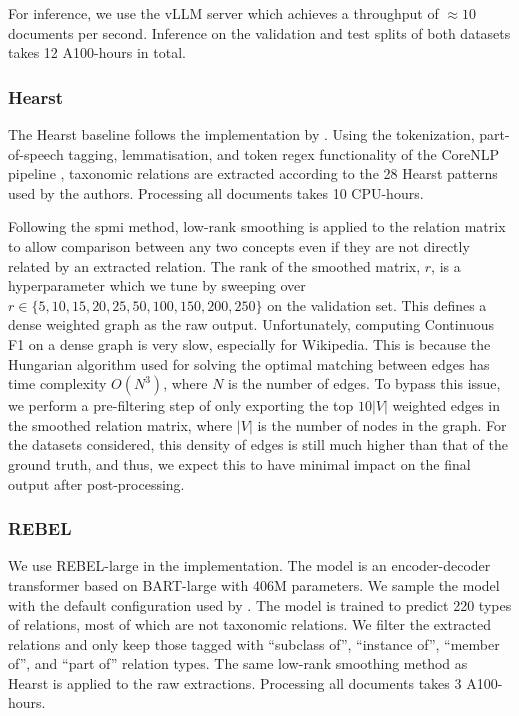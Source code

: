 For inference, we use the vLLM \cite{kwon2023efficient} server which achieves a throughput of $\approx 10$ documents per second. Inference on the validation and test splits of both datasets takes 12 A100-hours in total.

\subsubsection{Hearst}

The Hearst baseline follows the implementation by \citet{roller2018hearst}. Using the tokenization, part-of-speech tagging, lemmatisation, and token regex functionality of the CoreNLP pipeline \cite{manning2014stanford}, taxonomic relations are extracted according to the 28 Hearst patterns used by the authors. Processing all documents takes 10 CPU-hours.

Following the spmi method, low-rank smoothing is applied to the relation matrix to allow comparison between any two concepts even if they are not directly related by an extracted relation. The rank of the smoothed matrix, $r$, is a hyperparameter which we tune by sweeping over $r \in \{5, 10, 15, 20, 25, 50, 100, 150, 200, 250\}$ on the validation set. This defines a dense weighted graph as the raw output. Unfortunately, computing Continuous F1 on a dense graph is very slow, especially for Wikipedia. This is because the Hungarian algorithm used for solving the optimal matching between edges has time complexity $O(N^3)$, where $N$ is the number of edges. To bypass this issue, we perform a pre-filtering step of only exporting the top $10|V|$ weighted edges in the smoothed relation matrix, where $|V|$ is the number of nodes in the graph. For the datasets considered, this density of edges is still much higher than that of the ground truth, and thus, we expect this to have minimal impact on the final output after post-processing.

\subsubsection{REBEL}

We use REBEL-large \cite{cabot2021rebel} in the implementation. The model is an encoder-decoder transformer based on BART-large \cite{lewis2019bart} with 406M parameters. We sample the model with the default configuration used by \citet{cabot2021rebel}. The model is trained to predict 220 types of relations, most of which are not taxonomic relations. We filter the extracted relations and only keep those tagged with ``subclass of'', ``instance of'', ``member of'', and ``part of'' relation types. The same low-rank smoothing method as Hearst is applied to the raw extractions. Processing all documents takes 3 A100-hours.

